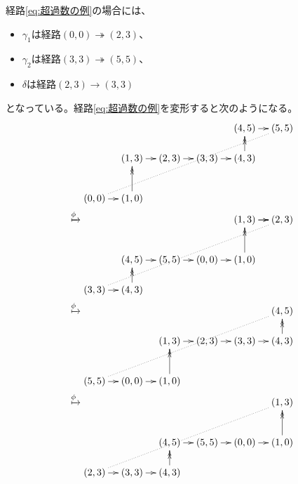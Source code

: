 {	経路\eqref{eq:超過数の例}の場合には、
	\begin{itemize}\setlength{\itemsep}{-1mm} %
		\item $\gamma_1$は経路$(0,0)\twoheadrightarrow(2,3)$、
		\item $\gamma_2$は経路$(3,3)\twoheadrightarrow(5,5)$、
		\item $\delta$は経路$(2,3)\to(3,3)$
	\end{itemize} %
	となっている。経路\eqref{eq:超過数の例}を変形すると次のようになる。
	\begin{equation*}\begin{split}
		& \xymatrix@R=1ex@C=1em{
			& & & & (4,5) \ar[r] & (5,5) \\
			\\
			& (1,3) \ar[r] & (2,3) \ar[r] & (3,3) \ar[r] & (4,3) \ar@{>>}[uu] \\
			\\
			\\
			(0,0) \ar[r] \ar@{.}[rrrrruuuuu] & (1,0) \ar@{>>}[uuu] \\
		} \\
		\xmapsto{\phi} & \xymatrix@R=1ex@C=1em{
			& & & & (1,3) \ar[r] \ar[r] & (2,3) \\
			\\
			\\
			& (4,5) \ar[r] & (5,5) \ar[r] & (0,0) \ar[r] & (1,0) \ar@{>>}[uuu] \\
			\\
			(3,3) \ar[r] \ar@{.}[rrrrruuuuu] & (4,3) \ar@{>>}[uu] \\
		} \\
		\xmapsto{\phi} & \xymatrix@R=1ex@C=1em{
			& & & & & (4,5) \\
			\\
			& & (1,3) \ar[r] & (2,3) \ar[r] & (3,3) \ar[r] & (4,3) \ar@{>>}[uu] \\
			\\
			\\
			(5,5) \ar[r] \ar@{.}[rrrrruuuuu] & (0,0) \ar[r] & (1,0) \ar@{>>}[uuu] \\
		} \\
		\xmapsto{\phi} & \xymatrix@R=1ex@C=1em{
			& & & & & (1,3) \\
			\\
			\\
			& & (4,5) \ar[r] & (5,5) \ar[r] & (0,0) \ar[r] & (1,0) \ar@{>>}[uuu] \\
			\\
			(2,3) \ar[r] \ar@{.}[rrrrruuuuu] & (3,3) \ar[r] & (4,3) \ar@{>>}[uu] \\
}
\end{split}
\end{equation*}}
